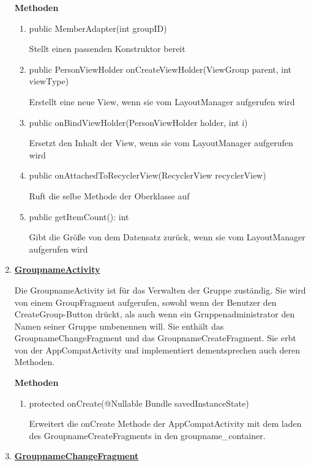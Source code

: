 \begin{enumerate}
	\textbf{Methoden}
	\begin{enumerate}
		\item public MemberAdapter(int groupID)
		
		Stellt einen passenden Konstruktor bereit
		
		\item public PersonViewHolder onCreateViewHolder(ViewGroup parent, int viewType)
	
		Erstellt eine neue View, wenn sie vom LayoutManager aufgerufen wird
		
		\item public onBindViewHolder(PersonViewHolder holder, int i)

		Ersetzt den Inhalt der View, wenn sie vom LayoutManager aufgerufen wird
		
		\item public onAttachedToRecyclerView(RecyclerView recyclerView)
		
		Ruft die selbe Methode der Oberklasse auf
		
		\item public getItemCount(): int

		Gibt die Größe von dem Datensatz zurück, wenn sie vom LayoutManager aufgerufen wird
	\end{enumerate}


	\item \textbf{\underline{GroupnameActivity}}
	
	Die GroupnameActivity ist für das Verwalten der Gruppe zuständig. Sie wird von einem GroupFragment aufgerufen, sowohl wenn der Benutzer den CreateGroup-Button drückt, als auch wenn ein Gruppenadministrator den Namen seiner Gruppe umbenennen will. Sie enthält das GroupnameChangeFragment und das GroupnameCreateFragment. Sie erbt von der AppCompatActivity und implementiert dementsprechen auch deren Methoden.
	
	\textbf{Methoden}
	\begin{enumerate}
		\item protected onCreate(@Nullable Bundle savedInstanceState)
		
		Erweitert die onCreate Methode der AppCompatActivity mit dem laden des GroupnameCreateFragments in den groupname\_container.
		
	\end{enumerate}
	
	\item \textbf{\underline{GroupnameChangeFragment}}
	

\end{enumerate}
